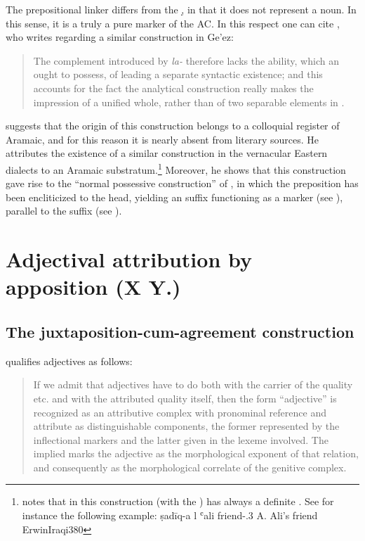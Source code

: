 {{{{The prepositional linker  differs from the  \d, in that it does not represent a noun. In this sense, it is a truly a pure marker of the AC. In this respect one can cite \citet[254]{PolotskySchneider}, who writes regarding a similar construction in Ge'ez: \blockquote{The
complement introduced by \textit{la-} therefore lacks the ability, which an  ought to  possess, of leading a separate syntactic existence; and this accounts for the fact the analytical construction really makes the impression of a unified whole, rather than of two separable elements in .}

\citet[30ff.]{HopkinsName} suggests that the origin of this construction belongs to a colloquial register of Aramaic, and for this reason it is nearly absent from literary sources. He attributes the existence of a similar construction in the vernacular Eastern  dialects to an Aramaic substratum.\footnote{\citet[380]{ErwinIraqi} notes  that in \Iraq this construction (with the ) has always a definite  \secn. See for instance the following example:
{ṣadīq-a l\cb{} ʿali}
{friend-\poss.3\masc{} \dat\cb{} A.}
{Ali's friend}
{ErwinIraqi}{380}

} Moreover, he shows that this construction gave rise to the  \enquote{normal possessive construction} of \WNA, in which the  preposition has been encliticized to the head, yielding an  suffix functioning as a \cst* marker (see ), parallel to the  \ed suffix (see ). 


\section{Adjectival attribution by apposition (X Y.\agr)} \label{ss:syr_adj}

\subsection{The juxtaposition-cum-agreement construction}

\citet[8]{GoldenbergAttribution} qualifies adjectives as follows: \blockquote{If we admit that
adjectives have to do both with the carrier of the quality etc. and with the attributed
quality itself, then the form \enquote{adjective} is recognized as an attributive complex
with pronominal reference and attribute as distinguishable components, the former
represented by the inflectional markers and the latter given in the lexeme involved.
The implied  marks the adjective as the morphological exponent
of that relation, and consequently as the morphological correlate of the genitive
complex.}


}}}}
